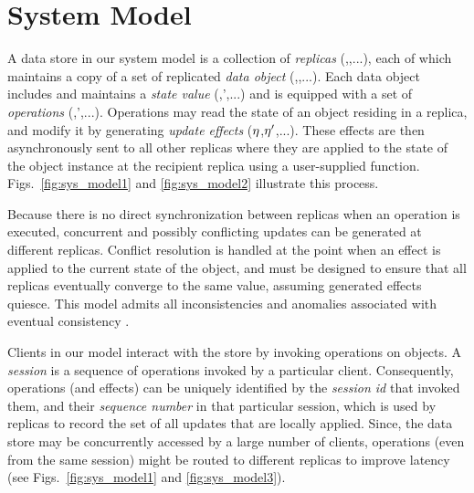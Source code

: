 \section{System Model}
\label{sec:sys_model}

A data store in our system model is a collection of \emph{replicas}
(,,...), each of which maintains a copy of a set of
replicated \emph{data object} (\xO,\yO,...).  Each data object includes
and maintains a \emph{state value} (\vO,\vO',...) and is equipped with a set of \emph{operations}
(\opO,\opO',...). Operations may read the state of an object
residing in a replica, and modify it by generating \emph{update
effects} ($\eta$,$\eta'$,...).
These effects are then asynchronously sent to all other replicas where
they are applied to the state of the object instance at the recipient
replica using a user-supplied function.
Figs.~\ref{fig:sys_model1} and \ref{fig:sys_model2} illustrate this
process.

Because there is no direct synchronization between replicas when an
operation is executed, concurrent and possibly conflicting updates can
be generated at different replicas.  Conflict resolution is handled at
the point when an effect is applied to the current state of the
object, and must be designed to ensure that all replicas eventually
converge to the same value, assuming generated effects quiesce.  This
model admits all inconsistencies and anomalies associated with
eventual consistency \cite{quelea,terry}.

Clients in our model interact with the store by invoking operations on
objects.  A \emph{session} is a sequence of operations invoked by a
particular client. Consequently, operations (and effects) can be
uniquely identified by the \emph{session id} that invoked them, and
their \emph{sequence number} in that particular session, which is used
by replicas to record the set of all updates that are locally applied.
Since, the data store may be concurrently accessed by a large number
of clients, operations (even from the same session) might be routed to
different replicas to improve latency (see Figs.~\ref{fig:sys_model1}
and \ref{fig:sys_model3}).

